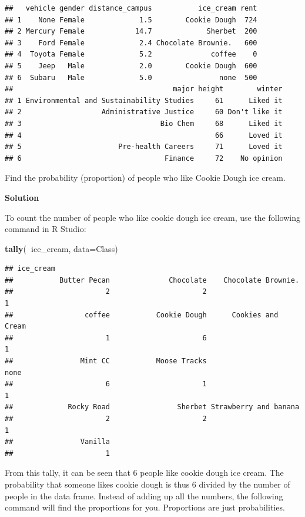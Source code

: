 \documentclass[]{book}
\newenvironment{Shaded}{\begin{snugshade}}{\end{snugshade}}
\newcommand{\DataTypeTok}[1]{\textcolor[rgb]{0.13,0.29,0.53}{#1}}
\newcommand{\KeywordTok}[1]{\textcolor[rgb]{0.13,0.29,0.53}{\textbf{#1}}}
\newcommand{\NormalTok}[1]{#1}
\newcommand{\OperatorTok}[1]{\textcolor[rgb]{0.81,0.36,0.00}{\textbf{#1}}}
\begin{document}
\begin{verbatim}
##   vehicle gender distance_campus           ice_cream rent
## 1    None Female             1.5        Cookie Dough  724
## 2 Mercury Female            14.7             Sherbet  200
## 3    Ford Female             2.4 Chocolate Brownie.   600
## 4  Toyota Female             5.2              coffee    0
## 5    Jeep   Male             2.0        Cookie Dough  600
## 6  Subaru   Male             5.0                none  500
##                                      major height        winter
## 1 Environmental and Sustainability Studies     61      Liked it
## 2                   Administrative Justice     60 Don't like it
## 3                                 Bio Chem     68      Liked it
## 4                                              66      Loved it
## 5                       Pre-health Careers     71      Loved it
## 6                                  Finance     72    No opinion
\end{verbatim}

Find the probability (proportion) of people who like Cookie Dough ice cream.

\textbf{Solution}

To count the number of people who like cookie dough ice cream, use the following command in R Studio:

\begin{Shaded}
\begin{Highlighting}[]
\KeywordTok{tally}\NormalTok{(}\OperatorTok{~}\NormalTok{ice_cream, }\DataTypeTok{data=}\NormalTok{Class)}
\end{Highlighting}
\end{Shaded}

\begin{verbatim}
## ice_cream
##           Butter Pecan              Chocolate    Chocolate Brownie.  
##                      2                      2                      1 
##                 coffee           Cookie Dough      Cookies and Cream 
##                      1                      6                      1 
##                Mint CC           Moose Tracks                   none 
##                      6                      1                      1 
##             Rocky Road                Sherbet Strawberry and banana  
##                      2                      2                      1 
##                Vanilla 
##                      1
\end{verbatim}

From this tally, it can be seen that 6 people like cookie dough ice cream. The probability that someone likes cookie dough is thus 6 divided by the number of people in the data frame. Instead of adding up all the numbers, the following command will find the proportions for you. Proportions are just probabilities.
\end{document}
